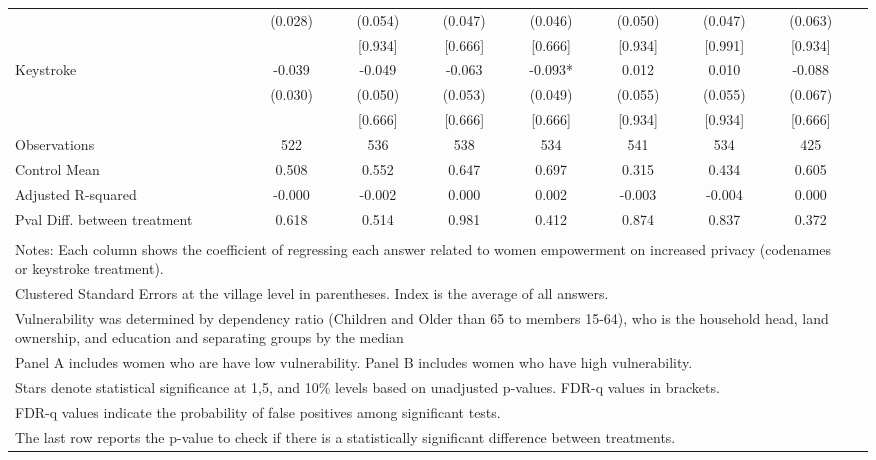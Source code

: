 \begin{tabular}{l*{8}{c}}
                    &     (0.028)   &     (0.054)   &     (0.047)   &     (0.046)   &     (0.050)   &     (0.047)   &     (0.063)   \\
                    &               &     [0.934]   &     [0.666]   &     [0.666]   &     [0.934]   &     [0.991]   &     [0.934]   \\
Keystroke           &      -0.039   &      -0.049   &      -0.063   &      -0.093*  &       0.012   &       0.010   &      -0.088   \\
                    &     (0.030)   &     (0.050)   &     (0.053)   &     (0.049)   &     (0.055)   &     (0.055)   &     (0.067)   \\
                    &               &     [0.666]   &     [0.666]   &     [0.666]   &     [0.934]   &     [0.934]   &     [0.666]   \\
\hline
Observations        &         522   &         536   &         538   &         534   &         541   &         534   &         425   \\
Control Mean        &       0.508   &       0.552   &       0.647   &       0.697   &       0.315   &       0.434   &       0.605   \\
Adjusted R-squared  &      -0.000   &      -0.002   &       0.000   &       0.002   &      -0.003   &      -0.004   &       0.000   \\
Pval Diff. between treatment&       0.618   &       0.514   &       0.981   &       0.412   &       0.874   &       0.837   &       0.372   \\
\hline \\ \multicolumn{8}{l}{\tiny Notes: Each column shows the coefficient of regressing each answer related to women empowerment
on increased privacy (codenames or keystroke treatment).} \\ \multicolumn{8}{l}{\tiny Clustered Standard Errors at the village level in parentheses. Index is the average of all answers.} \\  \multicolumn{8}{l}{\tiny Vulnerability was determined by dependency ratio (Children and Older than 65 to members 15-64), who is the household head, land ownership, and education and separating groups by the median} \\ \multicolumn{8}{l}{\tiny Panel A includes women who are have low vulnerability. Panel B includes women who have high vulnerability. } \\ \multicolumn{8}{l}{\tiny Stars denote statistical significance at 1,5, and 10\% levels based on unadjusted p-values. FDR-q values in brackets.} \\ \multicolumn{8}{l}{\tiny FDR-q values indicate the probability of false positives among significant tests.} \\ \multicolumn{8}{l}{\tiny The last row reports the p-value to check if there is a statistically significant difference between treatments. } \\  \hline\hline \end{tabular}
